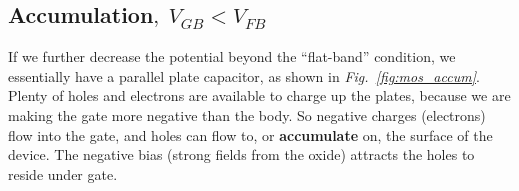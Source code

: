 \subsection{Accumulation\texorpdfstring{$,\;V_{GB}<V_{FB}$}{}}
If we further decrease the potential beyond the “flat-band” condition, we essentially have a parallel plate capacitor, as shown in \emph{Fig.~\ref{fig:mos_accum}}.  Plenty of holes and electrons are available to charge up the plates, because we are making the gate more negative than the body.  So negative charges (electrons) flow into the gate, and holes can flow to, or \textbf{accumulate} on, the surface of the device.  The negative bias (strong fields from the oxide) attracts the holes to reside under gate.
